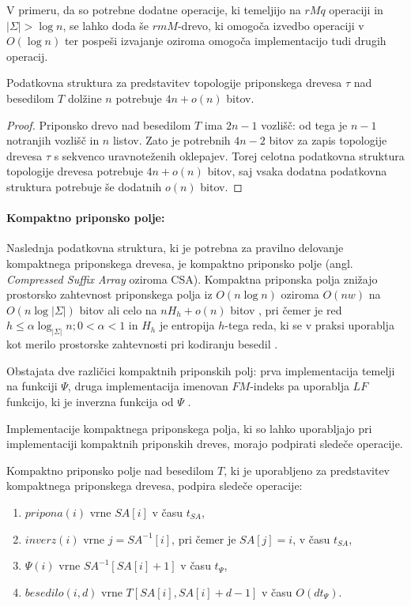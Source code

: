 V primeru, da so potrebne dodatne operacije, ki temeljijo na $rMq$ operaciji in $|\Sigma|>\log{n}$, se lahko doda še $rmM$-drevo, ki omogoča izvedbo operaciji v $O(\log{n})$ ter pospeši izvajanje oziroma omogoča implementacijo tudi drugih operacij.

\begin{lema}\label{lema:BP}
 Podatkovna struktura za predstavitev topologije priponskega drevesa $\tau$ nad besedilom $T$ dolžine $n$ potrebuje $4n+o(n)$ bitov.
\end{lema}

\begin{proof}
Priponsko drevo nad besedilom $T$ ima $2n-1$ vozlišč: od tega je $n-1$ notranjih vozlišč in $n$ listov. Zato je potrebnih $4n-2$ bitov za zapis topologije drevesa $\tau$ s sekvenco uravnoteženih oklepajev. Torej celotna podatkovna struktura topologije drevesa potrebuje $4n+o(n)$ bitov, saj vsaka dodatna podatkovna struktura potrebuje še dodatnih $o(n)$ bitov.
\end{proof}

\paragraph{Kompaktno priponsko polje:}
Naslednja podatkovna struktura, ki je potrebna za pravilno delovanje kompaktnega priponskega drevesa, je kompaktno priponsko polje (angl. \textit{Compressed Suffix Array} oziroma CSA). Kompaktna priponska polja znižajo prostorsko zahtevnost priponskega polja iz $O(n\log{n})$ oziroma $O(nw)$ na $O(n\log{|\Sigma|})$ bitov \cite{Grossi2000} ali celo na $nH_h +o(n)$ bitov \cite{Grossi2003}, pri čemer je red $h\le\alpha\log_{|\Sigma|}{n};0<\alpha<1$ in $H_h$ je entropija $h$-tega reda, ki se v praksi uporablja kot merilo prostorske zahtevnosti pri kodiranju besedil \cite{Navarro2016}.

Obstajata dve različici kompaktnih priponskih polj: prva implementacija temelji na funkciji $\Psi$, druga implementacija imenovan $FM$-indeks pa uporablja $LF$ funkcijo, ki je inverzna funkcija od $\Psi$ \cite{Navarro2016, Sadakane2007}.

Implementacije kompaktnega priponskega polja, ki so lahko uporabljajo pri implementaciji kompaktnih priponskih dreves, morajo podpirati sledeče operacije.

\begin{defi}\label{def:csa}
     Kompaktno priponsko polje nad besedilom $T$, ki je uporabljeno za predstavitev kompaktnega priponskega drevesa, podpira sledeče operacije:
    \begin{enumerate}
        \item $pripona(i)$ vrne $SA[i]$ v času $t_{SA}$,
        \item $inverz(i)$ vrne $j=SA^{-1}[i]$, pri čemer je $SA[j]=i$, v času $t_{SA}$,
        \item $\Psi(i)$ vrne $SA^{-1}[SA[i]+1]$ v času $t_\Psi$,
        \item $besedilo(i,d)$ vrne $T[SA[i],SA[i]+d-1]$ v času $O(dt_\Psi)$.
    \end{enumerate}    
\end{defi}

